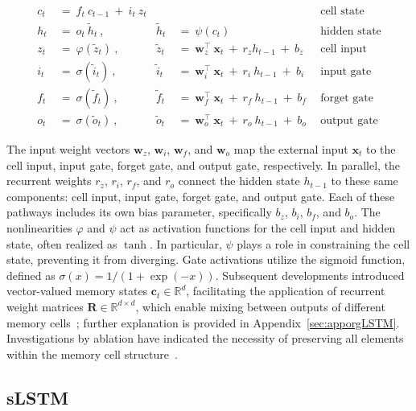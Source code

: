 \begin{align}
c_t \ &= \  f_t \ c_{t-1} \ + \ i_t \ z_t &  & &\text{cell state} \\
h_t  \ &= \ o_t \ \tilde{h}_t \ , & \tilde{h}_t \ &= \ \psi \left( c_t\right)
  &\text{hidden state} \\
z_t \ &= \ \varphi \left( \tilde{z}_t \right) \ , 
  &\tilde{z}_t \ &=  \ \mathbf{w}^\top_{z} \ \mathbf{x}_t \ + \
  r_{z}  h_{t-1} \ + \  b_{z} \ \
  &\text{cell input} \\
i_t \ &= \ \sigma \left( \tilde{i}_t  \right) \ , 
  &\tilde{i}_t \ &= \ \mathbf{w}^\top_{i} \ \mathbf{x}_t \ + \
  r_{i}  \ h_{t-1} \ + \  b_{i} \ \
  &\text{input gate} \\
f_t \ &= \ \sigma \left(  \tilde{f}_t \right) \ , 
  &\tilde{f}_t \ &= \ \mathbf{w}^\top_{f} \ \mathbf{x}_t  \ + \
  r_{f}  \ h_{t-1} \ + \  b_{f} \ \
  &\text{forget gate} \\
o_t \ &= \ \sigma \left( \tilde{o}_t \right) \ , 
  &\tilde{o}_t  \ &= \ \mathbf{w}^\top_{o} \ \mathbf{x}_t \ + \
  r_{o}  \ h_{t-1} \ + \  b_{o} \ \
  &\text{output gate} 
\end{align}

The input weight vectors $\mathbf{w}_{z}$, $\mathbf{w}_{i}$, $\mathbf{w}_{f}$, and $\mathbf{w}_{o}$ map the external input $\mathbf{x}_t$ to the cell input, input gate, forget gate, and output gate, respectively. In parallel, the recurrent weights $r_{z}$, $r_{i}$, $r_{f}$, and $r_{o}$ connect the hidden state $h_{t-1}$ to these same components: cell input, input gate, forget gate, and output gate. Each of these pathways includes its own bias parameter, specifically $b_{z}$, $b_{i}$, $b_{f}$, and $b_{o}$. The nonlinearities $\varphi$ and $\psi$ act as activation functions for the cell input and hidden state, often realized as $\tanh$. In particular, $\psi$ plays a role in constraining the cell state, preventing it from diverging. Gate activations utilize the sigmoid function, defined as $\sigma \left( x \right)= 1/(1+\exp(-x))$. Subsequent developments introduced vector-valued memory states $\mathbf{c}_t \in \mathbb{R}^{d}$, facilitating the application of recurrent weight matrices $\mathbf{R} \in \mathbb{R}^{d \times d}$, which enable mixing between outputs of different memory cells~\citep{Greff:15}; further explanation is provided in Appendix~\ref{sec:apporgLSTM}. Investigations by ablation have indicated the necessity of preserving all elements within the memory cell structure~\citep{Greff:15}.

\subsection{sLSTM}
\label{sec:sLSTM}

